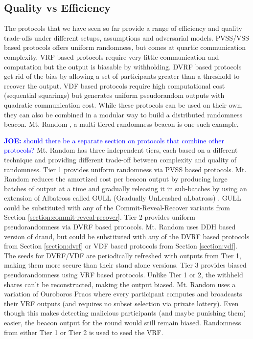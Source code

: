 \documentclass[letterpaper,twocolumn,10pt]{article}
\theoremstyle{definition}
\theoremstyle{remark}
\newcommand{\joenote}[1]{\textcolor{blue}{\textbf{JOE:} #1}}
\begin{document}
\subsection{Quality vs Efficiency}
The protocols that we have seen so far provide a range of efficiency and quality trade-offs under different setups, assumptions and adversarial models. PVSS/VSS based protocols offers uniform randomness, but comes at  quartic communication complexity. 
VRF based protocols require very little communication and computation but the output is biasable by withholding. DVRF based protocols get rid of the bias by allowing a set of participants greater than a threshold to recover the output. VDF based protocols require high computational cost (sequential squarings) but generates uniform pseudorandom outputs with quadratic communication cost. While these protocols can be used on their own, they can also be combined in a modular way to build a distributed randomness beacon. Mt. Random \cite{cascudomt}, a multi-tiered randomness beacon is one such example. 

\joenote{should there be a separate section on protocols that combine other protocols?}
Mt. Random has three independent tiers, each based on a different technique and providing different trade-off between complexity and quality of randomness. Tier 1 provides uniform randomness via PVSS based protocols. Mt. Random reduces the amortized cost per beacon output by producing large batches of output at a time and gradually releasing it in sub-batches by using an extension of Albatross called GULL (Gradually UnLeashed aLbatross) \cite{cascudomt}. GULL could be substituted with any of the Commit-Reveal-Recover variants from Section \ref{section:commit-reveal-recover}. Tier 2 provides uniform pseudorandomness via DVRF based protocols. Mt. Random uses DDH based version of drand, but could be substituted with any of the DVRF based protocols from Section \ref{section:dvrf} or VDF based protocols from Section \ref{section:vdf}. The seeds for DVRF/VDF are periodically refreshed with outputs from Tier 1, making them more secure than their stand alone versions. Tier 3 provides biased pseudorandomness using VRF based protocols. Unlike Tier 1 or 2, the withheld shares can't be reconstructed, making the output biased. Mt. Random uses a variation of Ouroboros Praos where every participant computes and broadcasts their VRF outputs (and requires no subset selection via private lottery). Even though this makes detecting malicious participants (and maybe punishing them) easier, the beacon output for the round would still remain biased. Randomness from either Tier 1 or Tier 2 is used to seed the VRF. 
\end{document}
